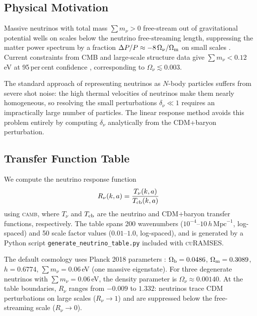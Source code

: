 \documentclass[fleqn,usenatbib]{mnras}
\newcommand{\curamses}{\textsc{cuRAMSES}}
\newcommand{\camb}{\textsc{camb}}
\newcommand{\code}[1]{\texttt{#1}}
\newcommand{\Onu}{\Omega_\nu}
\newcommand{\Om}{\Omega_{\rm m}}
\newcommand{\Rnu}{R_\nu}
\begin{document}
\subsection{Physical Motivation}
\label{sec:nu_motivation}

Massive neutrinos with total mass $\sum m_\nu > 0$ free-stream out of
gravitational potential wells on scales below the neutrino free-streaming
length, suppressing the matter power spectrum by a fraction
$\Delta P/P \approx -8\,\Onu/\Om$ on small scales
\citep{Lesgourgues2006}.  Current constraints from CMB and
large-scale structure data give $\sum m_\nu < 0.12$\,eV at 95\,per\,cent
confidence \citep{PlanckCollaboration2020}, corresponding to
$\Onu \lesssim 0.003$.

The standard approach of representing neutrinos as $N$-body
particles \citep{Brandbyge2008,Viel2010} suffers from severe shot
noise: the high thermal velocities of neutrinos make them
nearly homogeneous, so resolving the small perturbations
$\delta_\nu \ll 1$ requires an impractically large number of
particles.  The linear response method \citep{AliHaimoud2013,Bird2018}
avoids this problem entirely by computing $\delta_\nu$ analytically
from the CDM+baryon perturbation.

\subsection{Transfer Function Table}
\label{sec:nu_table}

We compute the neutrino response function
\begin{equation}
\Rnu(k,a) = \frac{T_\nu(k,a)}{T_{\rm cb}(k,a)}
\label{eq:rnu_def}
\end{equation}
using \camb, where $T_\nu$ and $T_{\rm cb}$ are the neutrino and
CDM+baryon transfer functions, respectively.  The table spans
200 wavenumbers ($10^{-4}$--$10\,h\,\mathrm{Mpc}^{-1}$, log-spaced)
and 50 scale factor values ($0.01$--$1.0$, log-spaced), and is
generated by a Python script \code{generate\_neutrino\_table.py}
included with \curamses.

The default cosmology uses Planck 2018 parameters
\citep{PlanckCollaboration2020}: $\Omega_{\rm b}=0.0486$,
$\Om=0.3089$, $h=0.6774$, $\sum m_\nu=0.06$\,eV (one massive
eigenstate).  For three degenerate neutrinos with $\sum m_\nu=0.06$\,eV,
the density parameter is $\Onu \approx 0.00140$.  At the table
boundaries, $\Rnu$ ranges from $-0.009$ to $1.332$: neutrinos
trace CDM perturbations on large scales ($\Rnu \to 1$) and are
suppressed below the free-streaming scale ($\Rnu \to 0$).
\end{document}
